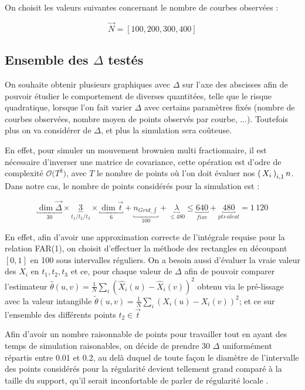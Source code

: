 On choisit les valeurs suivantes concernant le nombre de courbes observées :

$$
	\vec N = [ 100, 200, 300, 400]
$$

\subsection{Ensemble des $\Delta$ testés}

On souhaite obtenir plusieurs graphiques avec $\Delta$ sur l'axe des abscisses afin de pouvoir étudier le comportement de diverses quantitées, telle que le risque quadratique, lorsque l'on fait varier $\Delta$ avec certains paramètres fixés (nombre de courbes observées, nombre moyen de points observés par courbe, ...). Toutefois plus on va considérer de $\Delta$, et plus la simulation sera coûteuse.

En effet, pour simuler un mouvement brownien multi fractionnaire, il est nécessaire d'inverser une matrice de covariance, cette opération est d'odre de complexité $\mathcal O \bigl( T^3 \bigr)$, avec $T$ le nombre de points où l'on doit évaluer nos $\left( \, {X} _ {i} \, \right)_{i, 1} n$. Dans notre cas, le nombre de points considérés pour la simulation est :

$$\underbracket{\dim \vec\Delta}_{30} \times \underbracket{3}_{t_1 / t_2 / t_3} \times \underbracket{\dim \vec t}_{6} + \underbracket{n_{Grid\_\int}}_{100} + \underbracket{\lambda}_{\leq 480} \leq \underbracket{640}_{fixe} + \underbracket{480}_{pts \, aleat} = 1 \, 120$$

En effet, afin d'avoir une approximation correcte de l'intégrale requise pour la relation FAR(1), on choisit d'effectuer la méthode des rectangles en découpant $[0,1]$ en 100 sous intervalles réguliers. On a besoin aussi d'évaluer la vraie valeur des $X_i$ en $t_1, t_2, t_3$ et ce, pour chaque valeur de $\Delta$ afin de pouvoir comparer l'estimateur $\hat \theta(u,v) = \frac 1 N \sum_i (\widehat X_i(u) - \widehat X_i(v))^2$ obtenu via le pré-lissage avec la valeur intangible $\tilde \theta(u,v) = \frac 1 N \sum_i ( X_i(u) -  X_i(v))^2$; et ce sur l'ensemble des différents points $t_2 \in \vec t$


Afin d'avoir un nombre raisonnable de points pour travailler tout en ayant des temps de simulation raisonables, on décide de prendre 30 $\Delta$ uniformément répartis entre 0.01 et 0.2, au delà duquel de toute façon le diamètre de l'intervalle des points considérés pour la régularité devient tellement grand comparé à la taille du support, qu'il serait inconfortable de parler de \og régularité locale \fg.

